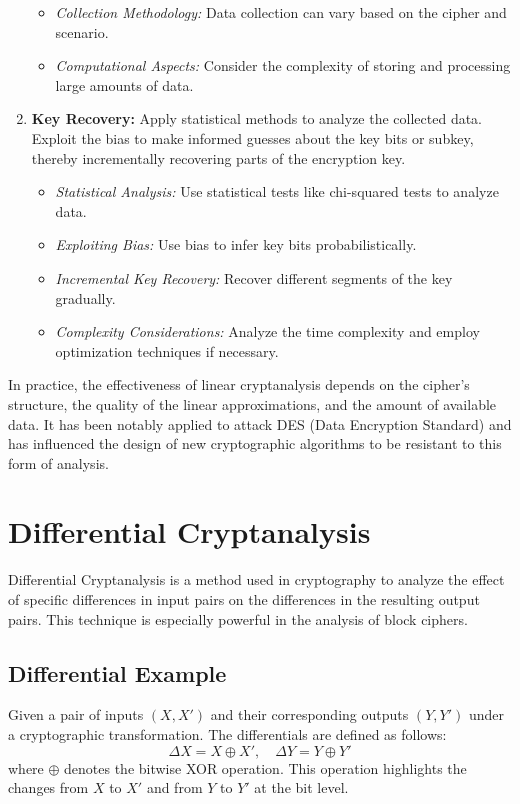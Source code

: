 \begin{enumerate}
\begin{itemize}
		\item \textit{Collection Methodology:} Data collection can vary based on the cipher and scenario.
		\item \textit{Computational Aspects:} Consider the complexity of storing and processing large amounts of data.
	\end{itemize}
	\item \textbf{Key Recovery:} Apply statistical methods to analyze the collected data. Exploit the bias to make informed guesses about the key bits or subkey, thereby incrementally recovering parts of the encryption key.
	\begin{itemize}
		\item \textit{Statistical Analysis:} Use statistical tests like chi-squared tests to analyze data.
		\item \textit{Exploiting Bias:} Use bias to infer key bits probabilistically.
		\item \textit{Incremental Key Recovery:} Recover different segments of the key gradually.
		\item \textit{Complexity Considerations:} Analyze the time complexity and employ optimization techniques if necessary.
	\end{itemize}
\end{enumerate}

In practice, the effectiveness of linear cryptanalysis depends on the cipher's structure, the quality of the linear approximations, and the amount of available data. It has been notably applied to attack DES (Data Encryption Standard) and has influenced the design of new cryptographic algorithms to be resistant to this form of analysis.

\newpage
\section{Differential Cryptanalysis}

Differential Cryptanalysis is a method used in cryptography to analyze the effect of specific differences in input pairs on the differences in the resulting output pairs. This technique is especially powerful in the analysis of block ciphers.

\subsection{Differential Example}

Given a pair of inputs $(X, X')$ and their corresponding outputs $(Y, Y')$ under a cryptographic transformation. The differentials are defined as follows:
\[ \Delta X = X \oplus X', \quad \Delta Y = Y \oplus Y' \]
where $\oplus$ denotes the bitwise XOR operation. This operation highlights the changes from $X$ to $X'$
and from $Y$ to $Y'$ at the bit level.

